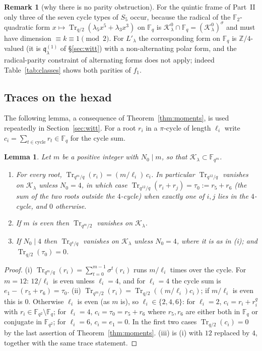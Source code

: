 ﻿\documentclass[12pt,a4paper]{amsart}
\newtheorem{lemma}[theorem]{Lemma}
\theoremstyle{definition}
\newtheorem{remark}[theorem]{Remark}
\newcommand{\F}{\mathbb{F}}
\newcommand{\Z}{\mathbb{Z}}
\newcommand{\Tr}{\operatorname{Tr}}
\newcommand{\Kk}{\mathcal{K}}
\newcommand{\qq}{\mathfrak{q}}
\begin{document}
\begin{remark}[why there is no parity obstruction]
For the quintic frame of Part~II only three of the seven cycle types of $S_5$ occur, because the radical of the $\F_2$-quadratic form $x\mapsto\Tr_{q/2}(\lambda_5x^5+\lambda_3x^3)$ on $\F_q$ is $\Kk^0_\lambda\cap\F_q=(\Kk^0_\lambda)^\sigma$ and must have dimension $\equiv k\equiv1\pmod 2$. For $L'_\lambda$ the corresponding form on $\F_q$ is $\Z/4$-valued (it is $\qq^{(1)}_\lambda$ of \S\ref{sec:witt}) with a non-alternating polar form, and the radical-parity constraint of alternating forms does not apply; indeed Table~\ref{tab:classes} shows both parities of $f_1$.
\end{remark}

\subsection{Traces on the hexad}
The following lemma, a consequence of Theorem~\ref{thm:moments}, is used repeatedly in Section~\ref{sec:witt}. For a root $r_i$ in a $\pi$-cycle of length $\ell_i$ write $c_i=\sum_{t\in\text{cycle}}r_t\in\F_q$ for the cycle sum.

\begin{lemma}\label{lem:traces}
Let $m$ be a positive integer with $N_0\mid m$, so that $\Kk_\lambda\subset\F_{q^m}$.
\begin{enumerate}[label=\textup{(\roman*)},leftmargin=2em]
\item For every root, $\Tr_{q^m/q}(r_i)=(m/\ell_i)\,c_i$. In particular $\Tr_{q^{12}/q}$ vanishes on $\Kk_\lambda$ unless $N_0=4$, in which case $\Tr_{q^{12}/q}(r_i+r_j)=\tau_0:=r_5+r_6$ (the sum of the two roots outside the $4$-cycle) when exactly one of $i,j$ lies in the $4$-cycle, and $0$ otherwise.
\item If $m$ is even then $\Tr_{q^m/2}$ vanishes on $\Kk_\lambda$.
\item If $N_0\mid4$ then $\Tr_{q^4/q}$ vanishes on $\Kk_\lambda$ unless $N_0=4$, where it is as in \textup{(i)}; and $\Tr_{q/2}(\tau_0)=0$.
\end{enumerate}
\end{lemma}
\begin{proof}
(i) $\Tr_{q^m/q}(r_i)=\sum_{t=0}^{m-1}\sigma^t(r_i)$ runs $m/\ell_i$ times over the cycle. For $m=12$: $12/\ell_i$ is even unless $\ell_i=4$, and for $\ell_i=4$ the cycle sum is $e_1-(r_5+r_6)=\tau_0$. (ii) $\Tr_{q^m/2}(r_i)=\Tr_{q/2}((m/\ell_i)c_i)$; if $m/\ell_i$ is even this is $0$. Otherwise $\ell_i$ is even (as $m$ is), so $\ell_i\in\{2,4,6\}$: for $\ell_i=2$, $c_i=r_i+r_i^q$ with $r_i\in\F_{q^2}\setminus\F_q$; for $\ell_i=4$, $c_i=\tau_0=r_5+r_6$ where $r_5,r_6$ are either both in $\F_q$ or conjugate in $\F_{q^2}$; for $\ell_i=6$, $c_i=e_1=0$. In the first two cases $\Tr_{q/2}(c_i)=0$ by the last assertion of Theorem~\ref{thm:moments}. (iii) is (i) with $12$ replaced by $4$, together with the same trace statement.
\end{proof}
\end{document}
